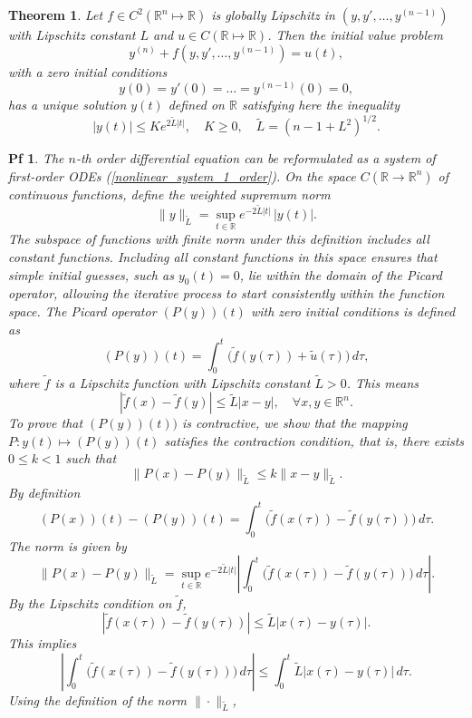 \documentclass[10pt,a4paper]{amsart}
\newtheorem{thm}{Theorem}
\newtheorem{pf}{Pf}
\begin{document}
\begin{thm} Let $f\in C^2(\mathbb{R}^n\mapsto \mathbb{R})$ is globally Lipschitz in \((y, y', \dots, y^{(n-1)})\) with Lipschitz constant $L$ and $u\in C(\mathbb{R}\mapsto \mathbb{R})$. Then the initial value problem
\[
y^{(n)} + f(y, y', \dots, y^{(n-1)}) = u(t),
\]
with a zero initial conditions
\[
y(0) = y'(0) = \dots = y^{(n-1)}(0) = 0,
\]
has a unique solution $y(t)$ defined on $\mathbb{R}$ satisfying here the inequality
\[
|y(t)|\leq Ke^{2\tilde L|t|},\quad  K\geq0,\quad \tilde L=({n-1+L^2})^{1/2}.
\]
\end{thm}

\begin{pf}
The \(n\)-th order differential equation can be reformulated as a system of first-order ODEs (\ref{nonlinear_system_1_order}).
On the space \( C(\mathbb{R} \to \mathbb{R}^n) \) of continuous functions, define the weighted supremum norm
\[
\|y\|_{\tilde L} = \sup_{t \in \mathbb{R}} e^{-2\tilde L|t|}\,|y(t)|.
\]
The subspace of functions with finite norm under this definition includes all constant functions. Including all constant functions in this space ensures that simple initial guesses, such as \(y_0(t) = 0\), lie within the domain of the Picard operator, allowing the iterative process to start consistently within the function space.
The Picard operator
\( (P(y))(t) \) with zero initial conditions is defined as
   \[
   (P(y))(t) = \int_0^t \big(\tilde f(y(\tau))+\tilde u(\tau) \big)\, d\tau,
   \]
   where \( \tilde f \) is a Lipschitz function with Lipschitz constant \( \tilde L > 0 \). This means
   \[
   |\tilde f(x) - \tilde f(y)| \leq \tilde L |x - y|, \quad \forall x, y\in \mathbb{R}^n.
   \]
To prove that \( (P(y))(t)) \) is contractive, we show that the mapping \( P: y(t) \mapsto (P(y))(t) \) satisfies the contraction condition, that is, there exists \( 0 \leq k < 1 \) such that
\[
\|P(x) - P(y)\|_{\tilde L} \leq k \|x - y\|_{\tilde L}.
\]
By definition
\[
(P(x))(t) - (P(y))(t) = \int_0^t \big(\tilde f(x(\tau)) - \tilde f(y(\tau))\big) \, d\tau.
\]
The norm is given by  
\[
\|P(x) - P(y)\|_{\tilde L} 
= \sup_{t \in \mathbb{R}} e^{-2\tilde L |t|} \left| \int_0^t \big(\tilde f(x(\tau)) - \tilde f(y(\tau))\big) \, d\tau \right|.
\]
By the Lipschitz condition on \( \tilde f \),  
\[
|\tilde f(x(\tau)) - \tilde f(y(\tau))| \leq \tilde L |x(\tau) - y(\tau)|.
\]  
This implies 
\[
\left| \int_0^t \big(\tilde f(x(\tau)) - \tilde f(y(\tau))\big) \, d\tau \right| \leq \int_0^t \tilde L |x(\tau) - y(\tau)| \, d\tau.
\]
Using the definition of the norm \( \|\cdot\|_{\tilde L} \),  

\end{pf}
\end{document}
